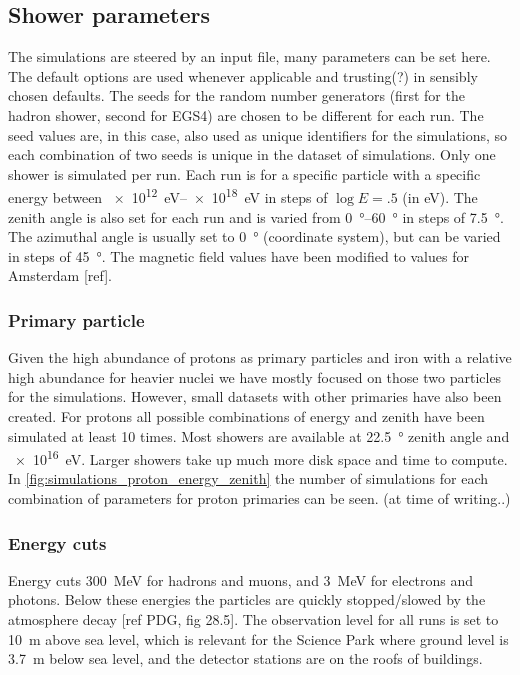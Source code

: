 \subsection{Shower parameters}

The simulations are steered by an input file, many parameters can be set
here. The default options are used whenever applicable and trusting(?)
in sensibly chosen defaults. The seeds for the random number generators
(first for the hadron shower, second for EGS4) are chosen to be
different for each run. The seed values are, in this case, also used as
unique identifiers for the simulations, so each combination of two seeds
is unique in the dataset of simulations. Only one shower is simulated
per run. Each run is for a specific particle with a specific energy
between \SIrange{e12}{e18}{\eV} in steps of $\log E = .5$
(in eV). The zenith angle is also set for each run and is varied from
\SIrange{0}{60}{\degree} in steps of \SI{7.5}{\degree}. The azimuthal
angle is usually set to \SI{0}{\degree} (\hisparc coordinate system),
but can be varied in steps of \SI{45}{\degree}. The magnetic field
values have been modified to values for Amsterdam [ref].


\subsubsection{Primary particle}

Given the high abundance of protons as primary particles and iron with a
relative high abundance for heavier nuclei we have mostly focused on
those two particles for the simulations. However, small datasets with
other primaries have also been created. For protons all possible
combinations of energy and zenith have been simulated at least 10 times.
Most showers are available at \SI{22.5}{\degree} zenith angle and
\SI{e16}{\eV}. Larger showers take up much more disk space and
time to compute. In \cref{fig:simulations_proton_energy_zenith} the
number of simulations for each combination of parameters for proton
primaries can be seen. (at time of writing..)


\subsubsection{Energy cuts}

Energy cuts \SI{300}{\MeV} for hadrons and muons, and
\SI{3}{\MeV} for electrons and photons. Below these
energies the particles are quickly stopped/slowed by the atmosphere
decay [ref PDG, fig 28.5]. The observation level for all runs is set to
\SI{10}{\meter} above sea level, which is relevant for the Science Park
where ground level is \SI{3.7}{\meter} below sea level, and the detector
stations are on the roofs of buildings.


